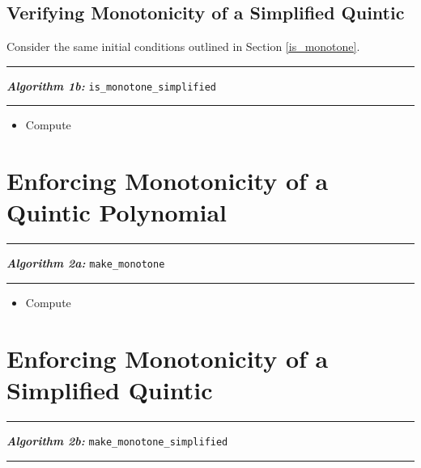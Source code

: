 \documentclass{article}
\begin{document}
\subsection{Verifying Monotonicity of a Simplified Quintic}

Consider the same initial conditions outlined in Section \ref{is_monotone}.

\vspace{10pt}
\hrule
\vspace{3pt}
\noindent\textbf{\textit{Algorithm 1b:}} \texttt{is\_monotone\_simplified}
\vspace{3pt}
\hrule

\begin{itemize}
  \itemsep0pt
  \parskip0pt

\item Compute
\end{itemize}


\section{Enforcing Monotonicity of a Quintic Polynomial}


\vspace{10pt}
\hrule
\vspace{3pt}
\noindent\textbf{\textit{Algorithm 2a:}} \texttt{make\_monotone}
\vspace{3pt}
\hrule

\begin{itemize}
  \itemsep0pt
  \parskip0pt

\item Compute
\end{itemize}


\section{Enforcing Monotonicity of a Simplified Quintic}


\vspace{10pt}
\hrule
\vspace{3pt}
\noindent\textbf{\textit{Algorithm 2b:}} \texttt{make\_monotone\_simplified}
\vspace{3pt}
\hrule
\end{document}
